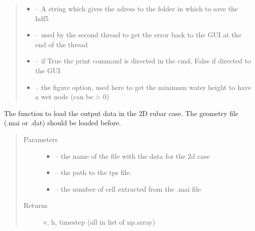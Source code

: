 \documentclass[letterpaper,10pt,english]{sphinxmanual}
\begin{document}
\begin{fulllineitems}
\begin{quote}
\begin{description}
\begin{itemize}
\item {} 
 -- A string which gives the adress to the folder in which to save the hdf5

\item {} 
 -- used by the second thread to get the error back to the GUI at the end of the thread

\item {} 
 -- if True the print command is directed in the cmd, False if directed to the GUI

\item {} 
 -- the figure option, used here to get the minimum water height to have a wet node (can be \textgreater{} 0)

\end{itemize}

\end{description}\end{quote}

\end{fulllineitems}


\begin{fulllineitems}
\label{\detokenize{index:src.rubar.load_tps_2d}}
The function to load the output data in the 2D rubar case. The geometry file (.mai or .dat) should be loaded before.
\begin{quote}\begin{description}
\item[{Parameters}] \leavevmode\begin{itemize}
\item {} 
 -- the name of the file with the data for the 2d case

\item {} 
 -- the path to the tps file.

\item {} 
 -- the number of cell extracted from the .mai file

\end{itemize}

\item[{Returns}] \leavevmode
v, h, timestep (all in list of np.array)

\end{description}\end{quote}

\end{fulllineitems}
\end{document}

